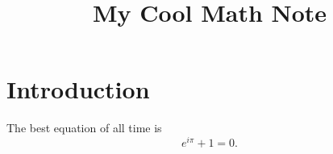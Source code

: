 \documentclass[reqno]{amsart} 
\begin{document}
\title{My Cool Math Note}

\section{Introduction}
The best equation of all time is
\begin{equation*}
  e^{i\pi} + 1 = 0.
\end{equation*}


{} 
\end{document}
